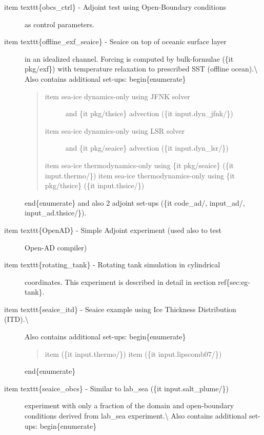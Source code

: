 \documentclass[letterpaper,10pt,english]{sphinxmanual}
\begin{document}
\begin{description}
\item[{item texttt\{obcs\_ctrl\} - Adjoint test using Open-Boundary conditions}] \leavevmode
as control parameters.

\item[{item texttt\{offline\_exf\_seaice\} - Seaice on top of oceanic surface layer}] \leavevmode
in an idealized channel. Forcing is computed by bulk-formulae (\{it pkg/exf\})
with temperature relaxation to prescribed SST (offline ocean).\textbackslash{}
Also contains additional set-ups:
begin\{enumerate\}
\begin{quote}
\begin{description}
\item[{item sea-ice dynamics-only using JFNK solver}] \leavevmode
and \{it pkg/thsice\} advection (\{it input.dyn\_jfnk/\})

\item[{item sea-ice dynamics-only using LSR solver}] \leavevmode
and \{it pkg/seaice\} advection (\{it input.dyn\_lsr/\})

\end{description}

item sea-ice thermodynamics-only using \{it pkg/seaice\} (\{it input.thermo/\})
item sea-ice thermodynamics-only using \{it pkg/thsice\} (\{it input.thsice/\})
\end{quote}

end\{enumerate\}
and also 2 adjoint set-ups (\{it code\_ad/, input\_ad/, input\_ad.thsice/\}).

\item[{item texttt\{OpenAD\} - Simple Adjoint experiment (used also to test}] \leavevmode
Open-AD compiler)

\item[{item texttt\{rotating\_tank\} - Rotating tank simulation in cylindrical}] \leavevmode
coordinates.  This experiment is described in detail in section
ref\{sec:eg-tank\}.

\item[{item texttt\{seaice\_itd\} - Seaice example using Ice Thickness Distribution (ITD).\textbackslash{}}] \leavevmode
Also contains additional set-ups:
begin\{enumerate\}
\begin{quote}

item (\{it input.thermo/\})
item (\{it input.lipscomb07/\})
\end{quote}

end\{enumerate\}

\item[{item texttt\{seaice\_obcs\} - Similar to \sphinxquotedblleft{}lab\_sea\sphinxquotedblright{} (\{it input.salt\_plume/\})}] \leavevmode
experiment with only a fraction of the domain and open-boundary conditions
derived from \sphinxquotedblleft{}lab\_sea\sphinxquotedblright{} experiment.\textbackslash{}
Also contains additional set-ups:
begin\{enumerate\}
\begin{quote}


\end{quote}
\end{description}
\end{document}
